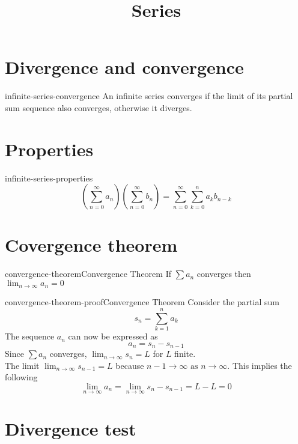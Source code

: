 \documentclass[preview]{standalone}
\begin{document}
\title{Series}
\genpage

\section{Divergence and convergence}

\begin{snippet}{infinite-series-convergence}
An infinite series converges if the limit
of its partial sum sequence also converges,
otherwise it diverges.
\end{snippet}

\section{Properties}

\begin{snippettheorem}{infinite-series-properties}{}{
    \[
        \left(
            \sum_{n=0}^\infty a_n
        \right)
        \left(
            \sum_{n=0}^\infty b_n
        \right)
        =
        \sum_{n=0}^\infty \sum_{k=0}^n a_k b_{n-k}
    \]
}
\end{snippettheorem}

\section{Covergence theorem}

\begin{snippettheorem}{convergence-theorem}{Convergence Theorem}{
    If \(\sum a_n\) converges then \(\lim_{n\to\infty}a_n=0\)
}
\end{snippettheorem}

\begin{snippetproof}{convergence-theorem-proof}{Convergence Theorem}{
    Consider the partial sum
    \[
        s_n = \sum_{k=1}^{n}a_k
    \]
    The sequence \(a_n\) can now be expressed as
    \[
        a_n = s_n - s_{n-1}
    \]
    Since \(\sum a_n\) converges, \(\lim_{n\to\infty}s_n=L\) for \(L\) finite. \\
    The limit \(\lim_{n\to\infty}s_{n-1}=L\) because \(n-1 \to \infty \text{ as } n \to \infty\).
    This implies the following
    \[
        \lim_{n \to \infty} a_n
        = \lim_{n \to \infty} s_n - s_{n-1} = L - L = 0
    \]
}
\end{snippetproof}

\section{Divergence test}
\end{document}

